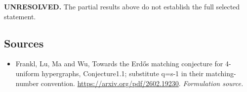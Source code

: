 \documentclass[11pt]{article}
\begin{document}
\textbf{UNRESOLVED.} The partial results above do not establish the full selected statement.

\subsection{Sources}
\begin{itemize}
\item[S1]Frankl, Lu, Ma and Wu, Towards the Erdős matching conjecture for 4-uniform hypergraphs, Conjecture1.1; substitute q=s-1 in their matching-number convention.
\url{https://arxiv.org/pdf/2602.19230}.
\textit{Formulation source.}
\end{itemize}
\end{document}
